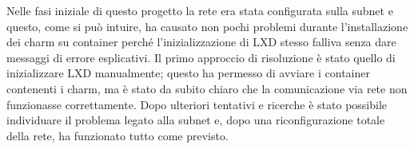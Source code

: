Nelle fasi iniziale di questo progetto la rete era stata configurata sulla subnet  e questo, come si può intuire, ha causato non pochi problemi durante l'installazione dei charm su container perché l'inizializzazione di LXD stesso falliva senza dare messaggi di errore esplicativi.
% 
Il primo approccio di risoluzione è stato quello di inizializzare LXD manualmente;
% 
questo ha permesso di avviare i container contenenti i charm, ma è stato da subito chiaro che la comunicazione via rete non funzionasse correttamente.
% 
Dopo ulteriori tentativi e ricerche è stato possibile individuare il problema legato alla subnet e, dopo una riconfigurazione totale della rete, ha funzionato tutto come previsto.
